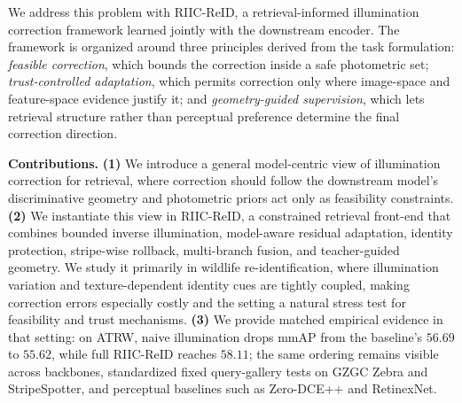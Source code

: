 \documentclass[sigconf,screen,review,anonymous]{acmart}
\begin{document}
We address this problem with RIIC-ReID, a retrieval-informed illumination correction framework
learned jointly with the downstream encoder.
The framework is organized around three principles derived from the task formulation:
\emph{feasible correction}, which bounds the correction inside a safe
photometric set;
\emph{trust-controlled adaptation}, which permits correction only where
image-space and feature-space evidence justify it;
and \emph{geometry-guided supervision}, which lets retrieval structure rather
than perceptual preference determine the final correction direction.

\noindent\textbf{Contributions.}
\textbf{(1)} We introduce a general model-centric view of illumination
correction for retrieval, where correction should follow the downstream
model's discriminative geometry and photometric priors act only as
feasibility constraints.
\textbf{(2)} We instantiate this view in RIIC-ReID, a constrained retrieval
front-end that combines bounded inverse illumination, model-aware residual
adaptation, identity protection, stripe-wise rollback, multi-branch fusion,
and teacher-guided geometry. We study it primarily in wildlife
re-identification, where illumination variation and texture-dependent identity
cues are tightly coupled, making correction errors especially costly and the
setting a natural stress test for feasibility and trust mechanisms.
\textbf{(3)} We provide matched empirical evidence in that setting: on ATRW,
naive illumination drops mmAP from the baseline's $56.69$ to $55.62$, while full RIIC-ReID
reaches $58.11$; the same ordering remains visible across backbones,
standardized fixed query-gallery tests on GZGC Zebra and StripeSpotter, and
perceptual baselines such as Zero-DCE++ and RetinexNet.
\end{document}
